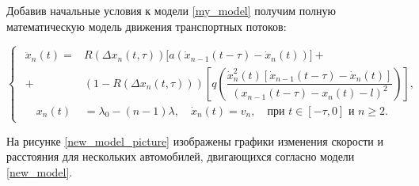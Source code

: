 \documentclass[12pt, a4paper]{extarticle}
\numberwithin{equation}{section}
\numberwithin{figure}{section}
\begin{document}
Добавив начальные условия к модели \eqref{my_model} получим полную математическую модель движения транспортных потоков:

\begin{equation} \label{new_model} 
\begin{cases}
\begin{split}
\ddot{x}_n(t)= &R(\Delta x_n(t,\tau))\bigg[ a(\dot{x}_{n-1}(t-\tau)-\dot{x}_n(t))\bigg]  +\\+& (1-R(\Delta x_n(t,\tau)))\left[  q\left(  \dfrac{\dot{x}_n^2(t)\left[  \dot{x}_{n-1}(t-\tau) - \dot{x}_n(t) \right]}{(x_{n-1}(t-\tau)-x_n(t)-l)^2}\right) \right], \\
 \quad x_n(t)&=\lambda_0-(n-1)\lambda, \quad \dot{x}_n(t)=v_{n}, \quad \text{при } t \in [-\tau,0] \text{ и } n\geq2.
\end{split}
\end{cases}
\end{equation}

На рисунке \ref{new_model_picture} изображены графики изменения скорости и расстояния для нескольких автомобилей, двигающихся согласно модели \eqref{new_model}.
\end{document}
